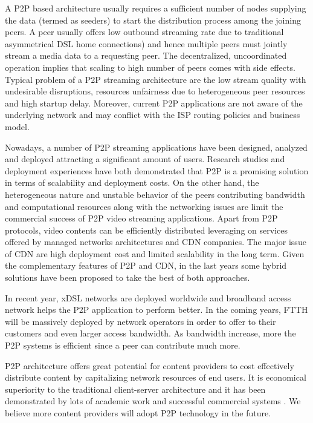 \documentclass[paper]{ieice}
\begin{document}
A P2P based architecture usually requires a sufficient number of nodes supplying the data (termed as seeders) to start the distribution process among the joining peers.
A peer usually offers low outbound streaming rate due to traditional asymmetrical DSL home connections) and hence multiple peers must jointly stream a media data to a requesting peer. 
The decentralized, uncoordinated operation implies that scaling to high number of peers comes with side effects.
Typical problem of a P2P streaming architecture are the low stream quality with undesirable disruptions, resources unfairness due to heterogeneous peer resources and high startup delay.
Moreover, current P2P applications are not aware of the underlying network and may conflict with the ISP routing policies and business model.

Nowadays, a number of P2P streaming applications have been designed, analyzed and deployed attracting a significant amount of users.
Research studies and deployment experiences have both demonstrated that P2P is a promising solution in terms of scalability and deployment costs.
On the other hand, the heterogeneous nature and unstable behavior of the peers contributing bandwidth and computational resources along with the networking issues are limit the commercial success of P2P video streaming applications.
Apart from P2P protocols, video contents can be efficiently distributed leveraging on services offered by managed networks architectures and CDN companies.
The major issue of CDN are high deployment cost and limited scalability in the long term.
Given the complementary features of P2P and CDN, in the last years some hybrid solutions have been proposed \cite{Huang:2008:UHC:1496046.1496064,4772628,Yin:2009:DDH:1631272.1631279} to take the best of both approaches.

In recent year, xDSL networks are deployed worldwide and broadband access network helps the P2P application to perform better.
In the coming years, FTTH will be massively deployed by network operators in order to offer to their customers and even larger access bandwidth.
As bandwidth increase, more the P2P systems is efficient since a peer can contribute much more. 

P2P architecture offers great potential for content providers to cost effectively distribute content by capitalizing network resources of end users.
It is economical superiority to the traditional client-server architecture and it has been demonstrated by lots of academic work and successful commercial systems \cite{Yin:2009:DDH:1631272.1631279}.
We believe more content providers will adopt P2P technology in the future. 
\end{document}
